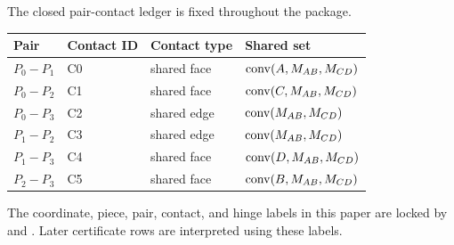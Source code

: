 The closed pair-contact ledger is fixed throughout the package.
\begin{center}
\begin{tabular}{llll}
\toprule
Pair & Contact ID & Contact type & Shared set\\
\midrule
\(P_0-P_1\) & C0 & shared face & \(\operatorname{conv}(A,M_{AB},M_{CD})\)\\
\(P_0-P_2\) & C1 & shared face & \(\operatorname{conv}(C,M_{AB},M_{CD})\)\\
\(P_0-P_3\) & C2 & shared edge & \(\operatorname{conv}(M_{AB},M_{CD})\)\\
\(P_1-P_2\) & C3 & shared edge & \(\operatorname{conv}(M_{AB},M_{CD})\)\\
\(P_1-P_3\) & C4 & shared face & \(\operatorname{conv}(D,M_{AB},M_{CD})\)\\
\(P_2-P_3\) & C5 & shared face & \(\operatorname{conv}(B,M_{AB},M_{CD})\)\\
\bottomrule
\end{tabular}
\end{center}

\begin{certprop}
The coordinate, piece, pair, contact, and hinge labels in this paper are locked
by 
and .  Later
certificate rows are interpreted using these labels.
\end{certprop}

